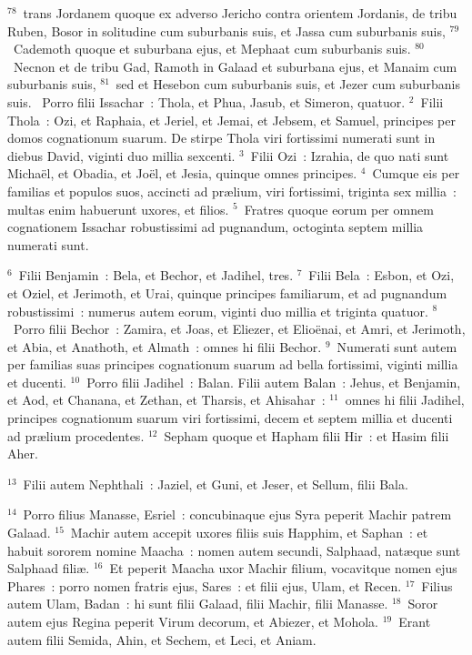 ${}^{78}$~trans Jordanem quoque ex adverso Jericho contra orientem Jordanis, de tribu Ruben, Bosor in solitudine cum suburbanis suis, et Jassa cum suburbanis suis,
${}^{79}$~Cademoth quoque et suburbana ejus, et Mephaat cum suburbanis suis.
${}^{80}$~Necnon et de tribu Gad, Ramoth in Galaad et suburbana ejus, et Manaim cum suburbanis suis,
${}^{81}$~sed et Hesebon cum suburbanis suis, et Jezer cum suburbanis suis.
~Porro filii Issachar~: Thola, et Phua, Jasub, et Simeron, quatuor.
${}^{2}$~Filii Thola~: Ozi, et Raphaia, et Jeriel, et Jemai, et Jebsem, et Samuel, principes per domos cognationum suarum. De stirpe Thola viri fortissimi numerati sunt in diebus David, viginti duo millia sexcenti.
${}^{3}$~Filii Ozi~: Izrahia, de quo nati sunt Micha\"el, et Obadia, et Jo\"el, et Jesia, quinque omnes principes.
${}^{4}$~Cumque eis per familias et populos suos, accincti ad pr\ae lium, viri fortissimi, triginta sex millia~: multas enim habuerunt uxores, et filios.
${}^{5}$~Fratres quoque eorum per omnem cognationem Issachar robustissimi ad pugnandum, octoginta septem millia numerati sunt.


${}^{6}$~Filii Benjamin~: Bela, et Bechor, et Jadihel, tres.
${}^{7}$~Filii Bela~: Esbon, et Ozi, et Oziel, et Jerimoth, et Urai, quinque principes familiarum, et ad pugnandum robustissimi~: numerus autem eorum, viginti duo millia et triginta quatuor.
${}^{8}$~Porro filii Bechor~: Zamira, et Joas, et Eliezer, et Elio\"enai, et Amri, et Jerimoth, et Abia, et Anathoth, et Almath~: omnes hi filii Bechor.
${}^{9}$~Numerati sunt autem per familias suas principes cognationum suarum ad bella fortissimi, viginti millia et ducenti.
${}^{10}$~Porro filii Jadihel~: Balan. Filii autem Balan~: Jehus, et Benjamin, et Aod, et Chanana, et Zethan, et Tharsis, et Ahisahar~:
${}^{11}$~omnes hi filii Jadihel, principes cognationum suarum viri fortissimi, decem et septem millia et ducenti ad pr\ae lium procedentes.
${}^{12}$~Sepham quoque et Hapham filii Hir~: et Hasim filii Aher.


${}^{13}$~Filii autem Nephthali~: Jaziel, et Guni, et Jeser, et Sellum, filii Bala.


${}^{14}$~Porro filius Manasse, Esriel~: concubinaque ejus Syra peperit Machir patrem Galaad.
${}^{15}$~Machir autem accepit uxores filiis suis Happhim, et Saphan~: et habuit sororem nomine Maacha~: nomen autem secundi, Salphaad, nat\ae que sunt Salphaad fili\ae .
${}^{16}$~Et peperit Maacha uxor Machir filium, vocavitque nomen ejus Phares~: porro nomen fratris ejus, Sares~: et filii ejus, Ulam, et Recen.
${}^{17}$~Filius autem Ulam, Badan~: hi sunt filii Galaad, filii Machir, filii Manasse.
${}^{18}$~Soror autem ejus Regina peperit Virum decorum, et Abiezer, et Mohola.
${}^{19}$~Erant autem filii Semida, Ahin, et Sechem, et Leci, et Aniam.


